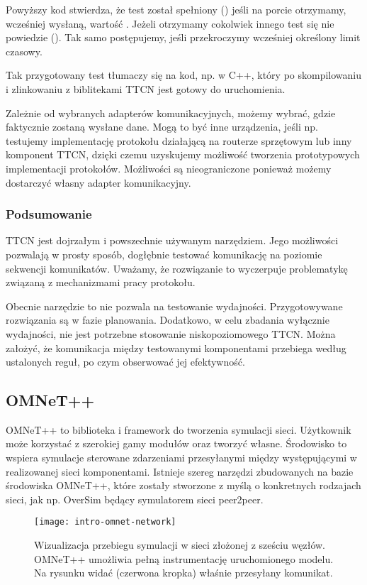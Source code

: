 \documentclass[00-praca-magisterska.tex]{subfiles}
\begin{document}
Powyższy kod stwierdza, że test został spełniony ()
jeśli na porcie  otrzymamy, wcześniej wysłaną, wartość .
Jeżeli otrzymamy cokolwiek innego test się nie powiedzie
().  Tak samo postępujemy, jeśli przekroczymy wcześniej
określony limit czasowy.

Tak przygotowany test tłumaczy się na kod, np. w C++, który po skompilowaniu i
zlinkowaniu z biblitekami TTCN jest gotowy do uruchomienia.

Zależnie od wybranych adapterów komunikacyjnych, możemy wybrać, gdzie
faktycznie zostaną wysłane dane. Mogą to być inne urządzenia, jeśli np.
testujemy implementację protokołu działającą na routerze sprzętowym lub inny
komponent TTCN, dzięki czemu uzyskujemy możliwość tworzenia prototypowych
implementacji protokołów. Możliwości są nieograniczone ponieważ możemy
dostarczyć własny adapter komunikacyjny.

\subsubsection{Podsumowanie}

TTCN jest dojrzałym i powszechnie używanym narzędziem. Jego możliwości pozwalają
w prosty sposób, dogłębnie testować komunikację na poziomie sekwencji
komunikatów. Uważamy, że rozwiązanie to wyczerpuje problematykę związaną z
mechanizmami pracy protokołu.

Obecnie narzędzie to nie pozwala na testowanie wydajności. Przygotowywane
rozwiązania są w fazie planowania. Dodatkowo, w celu zbadania wyłącznie
wydajności, nie jest potrzebne stosowanie niskopoziomowego TTCN. Można założyć,
że komunikacja między testowanymi komponentami przebiega według ustalonych
reguł, po czym obserwować jej efektywność.

\subsection{OMNeT++}

OMNeT++ to biblioteka i framework do tworzenia symulacji sieci. Użytkownik może korzystać z
szerokiej gamy modułów oraz tworzyć własne. Środowisko to wspiera symulacje
sterowane zdarzeniami przesyłanymi między występującymi w realizowanej sieci
komponentami. Istnieje szereg narzędzi zbudowanych na bazie środowiska OMNeT++,
które zostały stworzone z myślą o konkretnych rodzajach sieci, jak np. OverSim
będący symulatorem sieci peer2peer.

\begin{figure}
\begin{center}
\leavevmode
\texttt{[image: intro-omnet-network]}
\end{center}
\caption{Wizualizacja przebiegu symulacji w sieci złożonej z sześciu węzłów.
OMNeT++ umożliwia pełną instrumentację uruchomionego modelu. Na rysunku widać
(czerwona kropka) właśnie przesyłany komunikat.}
\label{fig:intro-omnet-network}
\end{figure}
\end{document}
